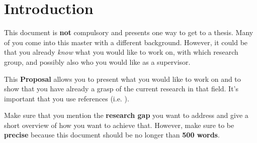 \section{Introduction}
\label{sec:introduction}
This document is \textbf{not} compulsory and presents one way to get to a thesis. Many of you come into this master with a different background. However, it could be that you already \textit{know} what you would like to work on, with which research group, and possibly also who you would like as a supervisor.

This \textbf{Proposal} allows you to present what you would like to work on and to show that you have already a grasp of the current research in that field. It's important that you use references (i.e. \cite{Gruber1995}).

Make sure that you mention the \textbf{research gap} you want to address and give a short overview of how you want to achieve that. However, make sure to be \textbf{precise} because this document should be no longer than \textbf{500 words}.
